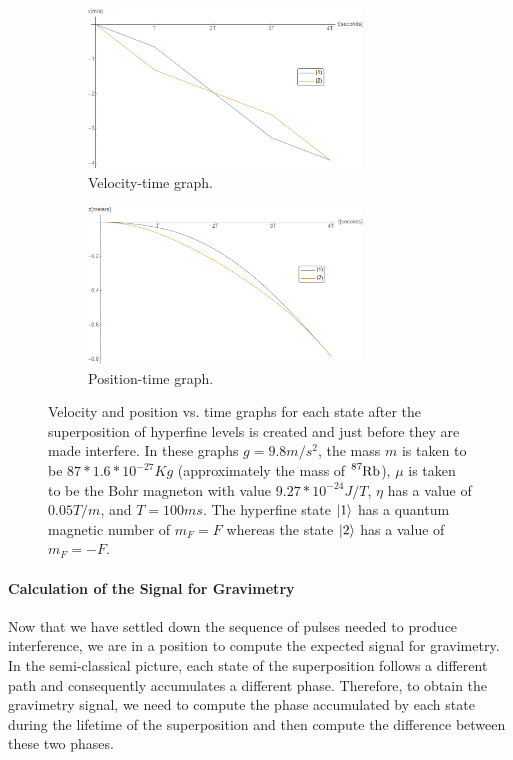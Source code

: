 \documentclass{article}
\begin{document}
\begin{figure}
    \centering
    \begin{subfigure}{1\textwidth}
        \centering
        \includegraphics[width=0.8\textwidth]{velocidad.png}
        \caption{Velocity-time graph.}
        \label{velocity_graph}
    \end{subfigure}
    \hfill
    \begin{subfigure}{1\textwidth}
        \centering
        \includegraphics[width=0.8\textwidth]{posicion.png}
        \caption{Position-time graph.}
        \label{position_graph}
    \end{subfigure}
    \caption{Velocity and position vs. time graphs for each state after the superposition of hyperfine levels is created and just before they are made interfere. In these graphs $g=9.8m/s^2$, the mass $m$ is taken to be $87*1.6*10^{-27} Kg$ (approximately the mass of $\ce{^{87}_{}Rb}$), $\mu$ is taken to be the Bohr magneton with value $9.27*10^{-24} J/T$, $\eta$ has a value of $0.05 T/m$, and $T=100ms$. 
    The hyperfine state $\ket{1}$ has a quantum magnetic number of $m_{F}=F$ whereas the state $\ket{2}$ has a value of $m_{F}=-F$.}
    \label{velocity_position_graphs}
\end{figure}

\paragraph{Calculation of the Signal for Gravimetry}
Now that we have settled down the sequence of pulses needed to produce interference, we are in a position to compute the expected signal for gravimetry. In the semi-classical picture, each state of the superposition follows a different path and consequently accumulates a different phase. Therefore, to obtain the gravimetry signal, we need to compute the phase accumulated by each state during the lifetime of the superposition and then compute the difference between these two phases. 
\end{document}
